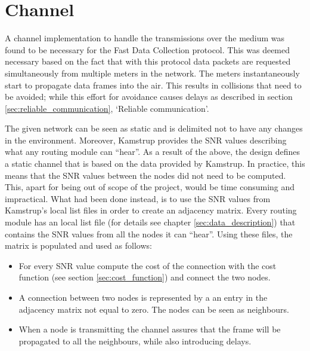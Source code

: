 \section{Channel}
\label{sec:channel}

A channel implementation to handle the transmissions over the medium was found to be necessary for the Fast Data Collection protocol. This was deemed necessary based on the fact that with this protocol data packets are requested simultaneously from multiple meters in the network. The meters instantaneously start to propagate data frames into the air. This results in collisions that need to be avoided; while this effort for avoidance causes delays as described in section \ref{sec:reliable_communication}, `Reliable communication'.

The given network can be seen as static and is delimited not to have any changes in the environment. Moreover, Kamstrup provides the SNR values describing what any routing module can ``hear''. As a result of the above, the design defines a static channel that is based on the data provided by Kamstrup. In practice, this means that the SNR values between the nodes did not need to be computed. This, apart for being out of scope of the project, would be time consuming and impractical. What had been done instead, is to use the SNR values from Kamstrup's local list files in order to create an adjacency matrix. Every routing module has an local list file (for details see chapter \ref{sec:data_description}) that contains the SNR values from all the nodes it can ``hear''. Using these files, the matrix is populated and used as follows:

\begin{itemize}
\item For every SNR value compute the cost of the connection with the cost function (see section \ref{sec:cost_function}) and connect the two nodes.
\item A connection between two nodes is represented by a an entry in the adjacency matrix not equal to zero. The nodes can be seen as neighbours.
\item When a node is transmitting the channel assures that the frame will be propagated to all the neighbours, while also introducing delays.
\end{itemize}

